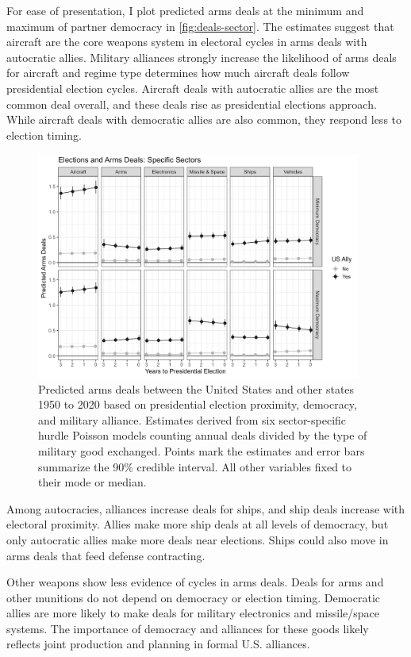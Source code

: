 \documentclass[12pt]{article}
\begin{document}
For ease of presentation, I plot predicted arms deals at the minimum and maximum of partner democracy in \autoref{fig:deals-sector}.
The estimates suggest that aircraft are the core weapons system in electoral cycles in arms deals with autocratic allies. 
Military alliances strongly increase the likelihood of arms deals for aircraft and regime type determines how much aircraft deals follow presidential election cycles. 
Aircraft deals with autocratic allies are the most common deal overall, and these deals rise as presidential elections approach. 
While aircraft deals with democratic allies are also common, they respond less to election timing. 



\begin{figure}[htpb]
	\centering
		\includegraphics[width=0.95\textwidth]{../figures/deals-sector.png}
	\caption{Predicted arms deals between the United States and other states 1950 to 2020 based on presidential election proximity, democracy, and military alliance. Estimates derived from six sector-specific hurdle Poisson models counting annual deals divided by the type of military good exchanged. Points mark the estimates and error bars summarize the 90\% credible interval. All other variables fixed to their mode or median.}
	\label{fig:deals-sector}
\end{figure}


Among autocracies, alliances increase deals for ships, and ship deals increase with electoral proximity. 
Allies make more ship deals at all levels of democracy, but only autocratic allies make more deals near elections. 
Ships could also move in arms deals that feed defense contracting. 


Other weapons show less evidence of cycles in arms deals. 
Deals for arms and other munitions do not depend on democracy or election timing. 
Democratic allies are more likely to make deals for military electronics and missile/space systems. 
The importance of democracy and alliances for these goods likely reflects joint production and planning in formal U.S. alliances. 
\end{document}
